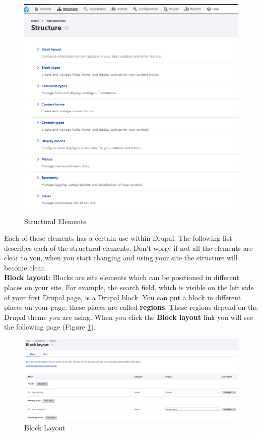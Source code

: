 \begin{figure}[h]
    \centering
    \includegraphics[width=1\linewidth]{img/ch4/admin_structure}
    \caption{Structural Elements}
\end{figure}

Each of these elements has a certain use within Drupal. The following list describes each of the structural elements. Don’t worry if not all the elements are clear to you, when you start changing and using your site the structure will become clear.
\\

\textbf{Block layout}: Blocks are site elements which can be positioned in different places on your site. For example, the search field, which is visible on the left side of your first Drupal page, is a Drupal block. You can put a block in different places on your page, these places are called \textbf{regions}. These regions depend on the Drupal theme you are using. When you click the \textbf{Block layout} link you will see the following page (Figure \ref{fig:admin_block_layout}).

\begin{figure}[h]
    \centering
    \includegraphics[width=1\linewidth]{img/ch4/admin_block_layout}
    \caption{Block Layout}
    \label{fig:admin_block_layout}
\end{figure}

